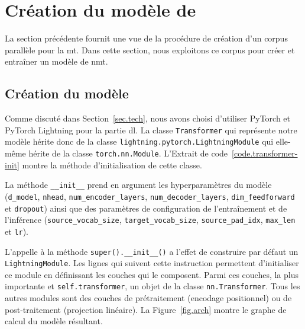 \section{Création du modèle de }%
\label{sec.mt-model-creation}

La section précédente fournit une vue de la procédure de création d'un corpus parallèle pour la \gls{mt}.
Dans cette section, nous exploitons ce corpus pour créer et entraîner un modèle de \gls{nmt}.

\subsection{Création du modèle}%
\label{subsec.mt-model-creation}

Comme discuté dans Section~\ref{sec.tech}, 
nous avons choisi d'utiliser PyTorch et \foreignlanguage{english}{PyTorch Lightning} pour la partie \gls{dl}.
La classe \verb|Transformer| qui représente notre modèle hérite donc de la classe
\verb|lightning.pytorch.LightningModule| qui elle-même hérite de la classe \verb|torch.nn.Module|.
L'Extrait de code~\ref{code.transformer-init} montre la méthode d'initialisation de cette classe.



La méthode \verb|__init__| prend en argument les hyperparamètres du modèle
(\verb|d_model|, \verb|nhead|, \verb|num_encoder_layers|, 
\verb|num_decoder_layers|, \verb|dim_feedforward| et \verb|dropout|)
ainsi que des paramètres de configuration de l'entraînement et de l'inférence
(\verb|source_vocab_size|, \verb|target_vocab_size|, \verb|source_pad_idx|, \verb|max_len| et \verb|lr|).

L'appelle à la méthode \verb|super().__init__()| a l'effet de construire par défaut un \verb|LightningModule|.
Les lignes qui suivent cette instruction permettent d'initialiser ce module 
en définissant les couches qui le composent.
Parmi ces couches, la plus importante et \verb|self.transformer|,
un objet de la classe \verb|nn.Transformer|.
Tous les autres modules sont des couches de prétraitement (encodage positionnel)
ou de post-traitement (projection linéaire).
La Figure~\ref{fig.arch} montre le graphe de calcul du modèle résultant.

